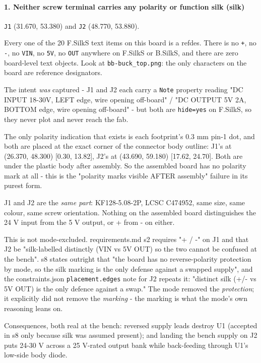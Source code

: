 \documentclass[11pt,a4paper]{article}
\begin{document}
\paragraph*{1. Neither screw terminal carries any polarity or function silk (silk)}
\texttt{J1} (31.670, 53.380) and \texttt{J2} (48.770, 53.880).

Every one of the 20 F.SilkS text items on this board is a refdes. There is no \texttt{+}, no \texttt{-}, no \texttt{VIN}, no \texttt{5V}, no \texttt{OUT} anywhere on F.SilkS or B.SilkS, and there are zero board-level text objects. Look at \texttt{bb-buck\_top.png}: the only characters on the board are reference designators.

The intent \emph{was} captured - J1 and J2 each carry a \texttt{Note} property reading "DC INPUT 18-30V, LEFT edge, wire opening off-board" / "DC OUTPUT 5V 2A, BOTTOM edge, wire opening off-board" - but both are \texttt{hide=yes} on F.SilkS, so they never plot and never reach the fab.

The only polarity indication that exists is each footprint's 0.3 mm pin-1 dot, and both are placed at the exact corner of the connector body outline: J1's at (26.370, 48.300) {[}0.30, 13.82{]}, J2's at (43.690, 59.180) {[}17.62, 24.70{]}. Both are under the plastic body after assembly. So the assembled board has no polarity mark at all - this is the "polarity marks visible AFTER assembly" failure in its purest form.

J1 and J2 are the \emph{same part}: KF128-5.08-2P, LCSC C474952, same size, same colour, same screw orientation. Nothing on the assembled board distinguishes the 24 V input from the 5 V output, or + from - on either.

This is not mode-excluded. requirements.md s2 requires "+ / -" on J1 and that J2 be "silk-labelled distinctly (VIN vs 5V OUT) so the two cannot be confused at the bench". s8 states outright that "the board has no reverse-polarity protection by mode, so the silk marking is the only defense against a swapped supply", and the constraints.json \texttt{placement.edges} note for J2 repeats it: "distinct silk (+/- vs 5V OUT) is the only defence against a swap." The mode removed the \emph{protection}; it explicitly did not remove the \emph{marking} - the marking is what the mode's own reasoning leans on.

Consequences, both real at the bench: reversed supply leads destroy U1 (accepted in s8 only because silk was assumed present); and landing the bench supply on J2 puts 24-30 V across a 25 V-rated output bank while back-feeding through U1's low-side body diode.
\end{document}
